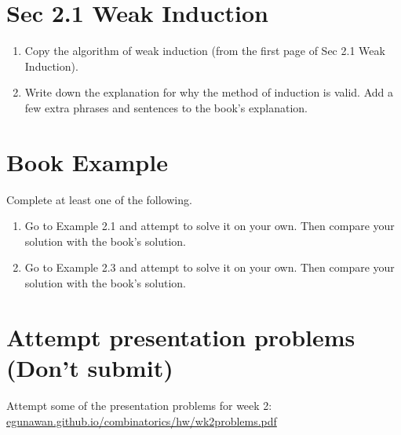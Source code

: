 \documentclass[10pt]{amsart}
\begin{document}
\section{Sec 2.1 Weak Induction}
\begin{enumerate}
	\item 
	Copy the algorithm of weak induction (from the first page of Sec 2.1 Weak Induction).
	
	\item Write down the explanation for why the method of induction is valid. Add a few extra phrases and sentences to the book's explanation.
\end{enumerate}


\section{Book Example}
Complete at least one of the following.


\begin{enumerate}
	\item 
	Go to Example 2.1 and attempt to solve it on your own. Then compare your solution with the book's solution.
	
	\item
	Go to Example 2.3 and attempt to solve it on your own. Then compare your solution with the book's solution.
\end{enumerate}

%	




\section*{Attempt presentation problems (Don't submit)}\label{sec:presentation}
Attempt some of the presentation problems for week 2:\\
\href{https://egunawan.github.io/combinatorics/hw/wk2problems.pdf}{egunawan.github.io/combinatorics/hw/wk2problems.pdf}
\end{document}
